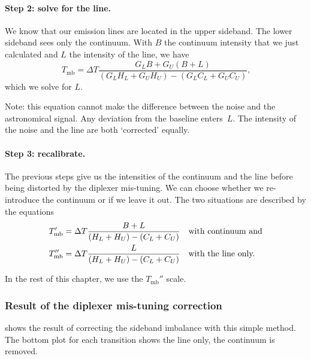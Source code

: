 \paragraph{Step 2: solve for the line.}
We know that our emission lines are located in the upper sideband.
The lower sideband sees only the continuum.
With $B$ the continuum intensity that we just calculated and $L$ the intensity of the line, we have
\begin{equation}
    T_\text{mb}
    =
    \Delta T
    \frac{
        G_L B + G_U (B + L)
    }{
        (G_L H_L + G_U H_U) - (G_L C_L + G_U C_U)
    }\text{,}
\end{equation}
which we solve for $L$.

Note: this equation cannot make the difference between the noise and the astronomical signal.
Any deviation from the baseline enters~$L$.
The intensity of the noise and the line are both `corrected' equally.

\paragraph{Step 3: recalibrate.}
The previous steps give us the intensities of the continuum and the line before being distorted by the diplexer mis-tuning.
We can choose whether we re-introduce the continuum or if we leave it out.
The two situations are described by the equations
\begin{align}
    T_\text{mb}'
    &=
    \Delta T
    \frac{B+L}{(H_L + H_U) - (C_L + C_U)} \text{\quad with continuum and}
    \\
    T_\text{mb}''
    &=
    \Delta T
    \frac{L}{(H_L + H_U) - (C_L + C_U)} \text{\quad with the line only.}
\end{align}

In the rest of this chapter, we use the $T_\text{mb}''$ scale.

\subsubsection{Result of the diplexer mis-tuning correction}
 shows the result of correcting the sideband imbalance with this simple method.
The bottom plot for each transition shows the line only, the continuum is removed.


